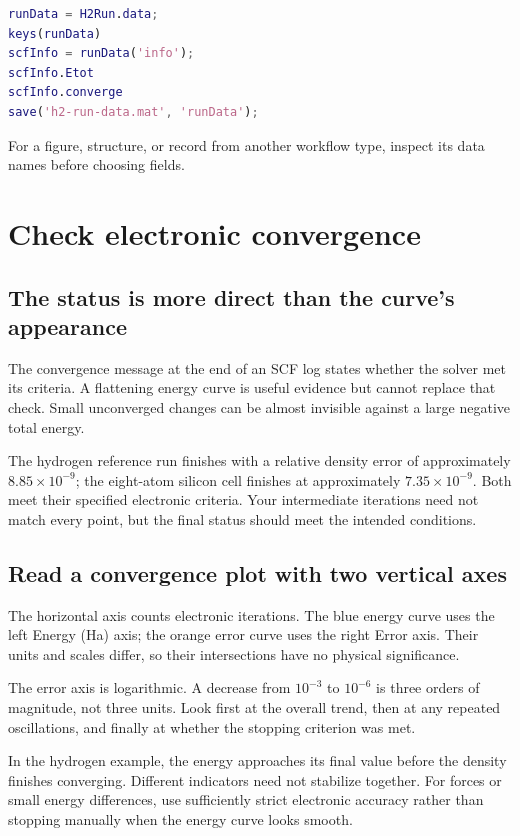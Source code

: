 \begin{lstlisting}[language=Matlab]
runData = H2Run.data;
keys(runData)
scfInfo = runData('info');
scfInfo.Etot
scfInfo.converge
save('h2-run-data.mat', 'runData');
\end{lstlisting}

For a figure, structure, or record from another workflow type, inspect its data names before choosing fields.

\section{Check electronic convergence}

\subsection{The status is more direct than the curve's appearance}

The convergence message at the end of an SCF log states whether the solver met its criteria. A flattening energy curve is useful evidence but cannot replace that check. Small unconverged changes can be almost invisible against a large negative total energy.

The hydrogen reference run finishes with a relative density error of approximately $8.85\times10^{-9}$; the eight-atom silicon cell finishes at approximately $7.35\times10^{-9}$. Both meet their specified electronic criteria. Your intermediate iterations need not match every point, but the final status should meet the intended conditions.

\subsection{Read a convergence plot with two vertical axes}

The horizontal axis counts electronic iterations. The blue energy curve uses the left Energy (Ha) axis; the orange error curve uses the right Error axis. Their units and scales differ, so their intersections have no physical significance.

The error axis is logarithmic. A decrease from $10^{-3}$ to $10^{-6}$ is three orders of magnitude, not three units. Look first at the overall trend, then at any repeated oscillations, and finally at whether the stopping criterion was met.

In the hydrogen example, the energy approaches its final value before the density finishes converging. Different indicators need not stabilize together. For forces or small energy differences, use sufficiently strict electronic accuracy rather than stopping manually when the energy curve looks smooth.


